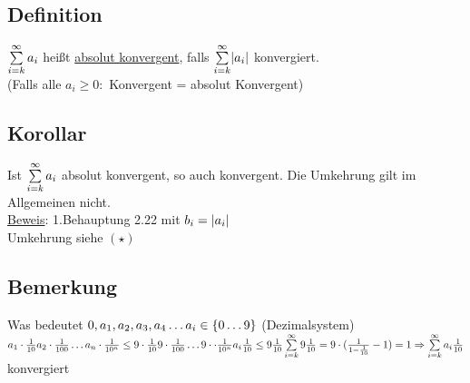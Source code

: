 \subsection{Definition}
$\sum\limits_{i=k}^{\infty} a_i$ hei\ss t \underline{absolut konvergent}, falls $\sum\limits_{i=k}^{\infty} \lvert a_i \rvert$ konvergiert. \\
(Falls alle $a_i \geq 0:$ Konvergent = absolut Konvergent)
\subsection{Korollar}
Ist $\sum\limits_{i=k}^{\infty} a_i$ absolut konvergent, so auch konvergent. Die Umkehrung gilt im Allgemeinen nicht.\\
\underline{Beweis}: 1.Behauptung 2.22 mit $b_i = \lvert a_i \rvert$\\
Umkehrung siehe $(\star)$
\subsection*{Bemerkung}
Was bedeutet $0,a_1,a_2,a_3,a_4 \ldots\\
a_i \in \{0 \ldots 9\}$ (Dezimalsystem)\\
$a_1 \cdot \frac{1}{10} a_2 \cdot \frac{1}{100} \ldots a_n \cdot \frac{1}{10^n} \leq 9 \cdot \frac{1}{10} 9 \cdot \frac{1}{100} \ldots 9 \cdot \cdot \frac{1}{10^n}\\
a_i \frac{1}{10} \leq 9 \frac{1}{10}\\
\sum\limits_{i=k}^{\infty} 9 \frac{1}{10} = 9 \cdot (\frac{1}{1-\frac{1}{10}}-1) = 1 \Rightarrow \sum\limits_{i=k}^{\infty} a_i \frac{1}{10}$ konvergiert
